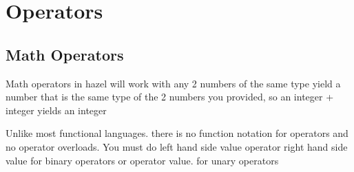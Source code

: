 \documentclass{article}
\begin{document}
\section{Operators}
\subsection{Math Operators}

Math operators in hazel will work with any 2 numbers of the same type yield a number that is the same type of the 2 numbers you provided, so
an integer + integer yields an integer 

Unlike most functional languages. there is no function notation for operators and no operator overloads.
 You must do left hand side value operator right hand side value for binary operators or operator value. for unary operators
\end{document}
